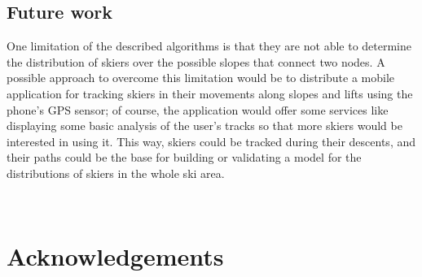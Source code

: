 \documentclass[12pt,a4paper,twoside]{book}
\begin{document}
\section{Future work}
\label{sec:future-work}

 One limitation of the described algorithms is that they are not able to determine the distribution of skiers over the possible slopes that connect two nodes. A possible approach to overcome this limitation would be to distribute a mobile application for tracking skiers in their movements along slopes and lifts using the phone's GPS sensor; of course, the application would offer some services like displaying some basic analysis of the user's tracks so that more skiers would be interested in using it. This way, skiers could be tracked during their descents, and their paths could be the base for building or validating a model for the distributions of skiers in the whole ski area.



{

}




\printglossaries


~\newpage ~\newpage

\chapter*{Acknowledgements}
\end{document}

